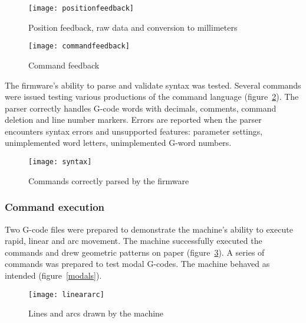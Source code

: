 \clearpage
\begin{figure}[ht]
    \centering
    \begin{minipage}{0.5\textwidth}
        \centering
        \texttt{[image: positionfeedback]}
        \caption{Position feedback, raw data and conversion to millimeters}
        \label{posfeedback}
    \end{minipage}\hfill
    \begin{minipage}{0.5\textwidth}
        \centering
        \texttt{[image: commandfeedback]}
        \caption{Command feedback}
        \label{comfeedback}
    \end{minipage}
\end{figure}

The firmware's ability to parse and validate syntax was tested. Several commands
were issued testing various productions of the command language
(figure~\ref{syntax}). The parser correctly handles G-code words with decimals,
comments, command deletion and line number markers. Errors are reported when
the parser encounters syntax errors and unsupported features: parameter
settings, unimplemented word letters, unimplemented G-word numbers.

\begin{figure}[ht]
    \begin{center}
        \texttt{[image: syntax]}
        \caption{Commands correctly parsed by the firmware}
        \label{syntax}
    \end{center}
\end{figure}

\subsubsection{Command execution}

Two G-code files were prepared to demonstrate the machine's ability to execute
rapid, linear and arc movement. The machine successfully executed the commands
and drew geometric patterns on paper (figure~\ref{lineararc}). A series of
commands was prepared to test modal G-codes. The machine behaved as intended
(figure~\ref{modals}).

\begin{figure}[ht]
    \begin{center}
        \texttt{[image: lineararc]}
        \caption{Lines and arcs drawn by the machine}
        \label{lineararc}
    \end{center}
\end{figure}

